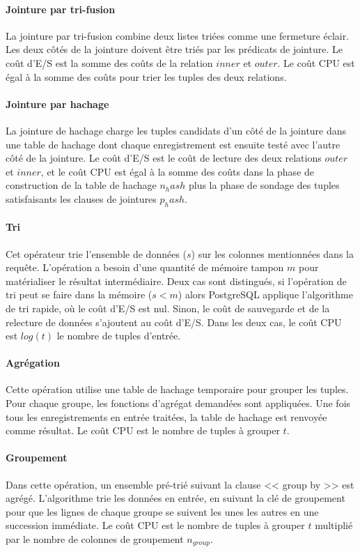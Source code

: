 \paragraph{Jointure par tri-fusion} La jointure par tri-fusion combine deux listes triées comme une fermeture éclair. Les deux côtés de la jointure doivent être triés par les prédicats de jointure. Le coût d'E/S est la somme des coûts de la relation $inner$ et $outer$. Le coût CPU est égal à la somme des coûts pour trier les tuples des deux relations.
\paragraph{Jointure par hachage} La jointure de hachage charge les tuples candidats d’un côté de la jointure dans une table de hachage dont chaque enregistrement est ensuite testé avec l’autre côté de la jointure. Le coût d'E/S est le coût de lecture des deux relations $outer$ et $inner$, et le coût CPU est égal à la somme des coûts dans la phase de construction de la table de hachage $n_hash$ plus la phase de sondage des tuples satisfaisants les clauses de jointures $p_hash$.
\paragraph{Tri} Cet opérateur trie l’ensemble de données ($s$) sur les colonnes mentionnées dans la requête. L'opération a besoin d’une quantité de mémoire tampon $m$ pour matérialiser le résultat intermédiaire. Deux cas sont distingués, si l'opération de tri peut se faire dans la mémoire ($s < m$) alors PostgreSQL applique l'algorithme de tri rapide, où le coût d'E/S est nul. Sinon, le coût de sauvegarde et de la relecture de données s'ajoutent au coût d'E/S. Dans les deux cas, le coût CPU est $log(t)$ le nombre de tuples d'entrée.
\paragraph{Agrégation} Cette opération utilise une table de hachage temporaire pour grouper les tuples. Pour chaque groupe, les fonctions d’agrégat demandées sont appliquées. Une fois tous les enregistrements en entrée traitées, la table de hachage est renvoyée comme résultat. Le coût CPU est le nombre de tuples à grouper $t$.
\paragraph{Groupement} Dans cette opération, un ensemble pré-trié suivant la clause << group by >> est agrégé. L'algorithme trie les données en entrée, en suivant la clé de groupement pour que les lignes de chaque groupe se suivent les unes les autres en une succession immédiate. Le coût CPU est le nombre de tuples à grouper $t$ multiplié par le nombre de colonnes de groupement $n_{group}$.

